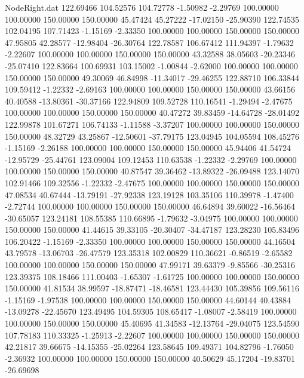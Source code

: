 \begin{filecontents}{NodeRight.dat}
 122.69466  104.52576  104.72778    -1.50982   -2.29769  100.00000  100.00000  150.00000  150.00000   45.47424   45.27222  -17.02150  -25.90390
 122.74535  102.04195  107.71423    -1.15169   -2.33350  100.00000  100.00000  150.00000  150.00000   47.95805   42.28577  -12.98404  -26.30764
 122.78587  106.67412  111.94397    -1.79632   -2.22607  100.00000  100.00000  150.00000  150.00000   43.32588   38.05603  -20.23346  -25.07410
 122.83664  100.69931  103.15002    -1.00844   -2.62000  100.00000  100.00000  150.00000  150.00000   49.30069   46.84998  -11.34017  -29.46255
 122.88710  106.33844  109.59412    -1.22332   -2.69163  100.00000  100.00000  150.00000  150.00000   43.66156   40.40588  -13.80361  -30.37166
 122.94809  109.52728  110.16541    -1.29494   -2.47675  100.00000  100.00000  150.00000  150.00000   40.47272   39.83459  -14.64728  -28.01492
 122.99878  101.67271  106.74133    -1.11588   -3.37207  100.00000  100.00000  150.00000  150.00000   48.32729   43.25867  -12.50601  -37.79175
 123.04945  104.05594  108.45276    -1.15169   -2.26188  100.00000  100.00000  150.00000  150.00000   45.94406   41.54724  -12.95729  -25.44761
 123.09004  109.12453  110.63538    -1.22332   -2.29769  100.00000  100.00000  150.00000  150.00000   40.87547   39.36462  -13.89322  -26.09488
 123.14070  102.91466  109.32556    -1.22332   -2.47675  100.00000  100.00000  150.00000  150.00000   47.08534   40.67444  -13.79191  -27.92338
 123.19128  103.35106  110.39978    -1.47400   -2.72744  100.00000  100.00000  150.00000  150.00000   46.64894   39.60022  -16.56464  -30.65057
 123.24181  108.55385  110.66895    -1.79632   -3.04975  100.00000  100.00000  150.00000  150.00000   41.44615   39.33105  -20.30407  -34.47187
 123.28230  105.83496  106.20422    -1.15169   -2.33350  100.00000  100.00000  150.00000  150.00000   44.16504   43.79578  -13.06703  -26.47579
 123.35318  102.00829  110.36621    -0.86519   -2.65582  100.00000  100.00000  150.00000  150.00000   47.99171   39.63379   -9.85566  -30.25316
 123.39375  108.18466  111.00403    -1.65307   -1.61725  100.00000  100.00000  150.00000  150.00000   41.81534   38.99597  -18.87471  -18.46581
 123.44430  105.39856  109.56116    -1.15169   -1.97538  100.00000  100.00000  150.00000  150.00000   44.60144   40.43884  -13.09278  -22.45670
 123.49495  104.59305  108.65417    -1.08007   -2.58419  100.00000  100.00000  150.00000  150.00000   45.40695   41.34583  -12.13764  -29.04075
 123.54590  107.78183  110.33325    -1.25913   -2.22607  100.00000  100.00000  150.00000  150.00000   42.21817   39.66675  -14.15355  -25.02264
 123.58645  109.49371  104.82796    -1.76050   -2.36932  100.00000  100.00000  150.00000  150.00000   40.50629   45.17204  -19.83701  -26.69698

\end{filecontents}
